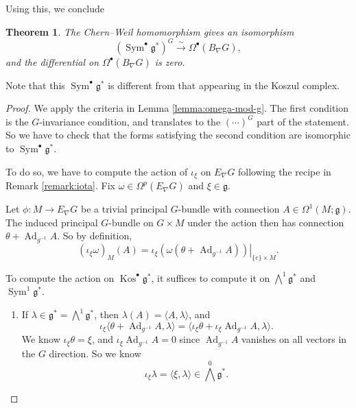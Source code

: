 \documentclass{shortart}
\newtheorem{thm}{Theorem}
\theoremstyle{definition}
\DeclareMathOperator\Ad{Ad}
\DeclareMathOperator\Sym{Sym}
\DeclareMathOperator\Kos{Kos}
\newcommand\exterior{{\textstyle \bigwedge}}
\begin{document}
Using this, we conclude
\begin{thm}
  The Chern--Weil homomorphism gives an isomorphism
  \[
    (\Sym^\bullet \mathfrak{g}^*)^G \overset{\sim}{\to} \Omega^\bullet(B_\nabla G),
  \]
  and the differential on $\Omega^\bullet(B_\nabla G)$ is zero.
\end{thm}
Note that this $\Sym^\bullet \mathfrak{g}^*$ is different from that appearing in the Koszul complex.

\begin{proof}
  We apply the criteria in Lemma \ref{lemma:omega-mod-g}. The first condition is the $G$-invariance condition, and translates to the $(\cdots)^G$ part of the statement. So we have to check that the forms satisfying the second condition are isomorphic to $\Sym^\bullet \mathfrak{g}^*$.

  To do so, we have to compute the action of $\iota_\xi$ on $E_\nabla G$ following the recipe in Remark \ref{remark:iota}. Fix $\omega \in \Omega^p(E_\nabla G)$ and $\xi \in \mathfrak{g}$.

  Let $\phi: M \to E_\nabla G$ be a trivial principal $G$-bundle with connection $A \in \Omega^1(M; \mathfrak{g})$. The induced principal $G$-bundle on $G \times M$ under the action then has connection $\theta + \Ad_{g^{-1}} A$. So by definition,
  \[
    (\iota_\xi \omega)_M(A) = \left.\iota_\xi \left(\omega(\theta + \Ad_{g^{-1}} A)\right)\right|_{\{e\} \times M}.
  \]

  To compute the action on $\Kos^\bullet \mathfrak{g}^*$, it suffices to compute it on $\exterior^1 \mathfrak{g}^*$ and $\Sym^1 \mathfrak{g}^*$.

  \begin{enumerate}
    \item If $\lambda \in \mathfrak{g}^* = \exterior^1 \mathfrak{g}^*$, then $\lambda(A) = \langle A, \lambda\rangle$, and
      \[
        \iota_\xi \langle \theta + \Ad_{g^{-1}} A, \lambda\rangle = \langle \iota_\xi \theta + \iota_\xi \Ad_{g^{-1}} A, \lambda\rangle.
      \]
      We know $\iota_\xi \theta = \xi$, and $\iota_\xi \Ad_{g^{-1}} A = 0$ since $\Ad_{g^{-1}} A$ vanishes on all vectors in the $G$ direction. So we know
      \[
        \iota_\xi \lambda = \langle \xi, \lambda\rangle \in \exterior^0 \mathfrak{g}^*.
      \]


\end{enumerate}
\end{proof}
\end{document}
